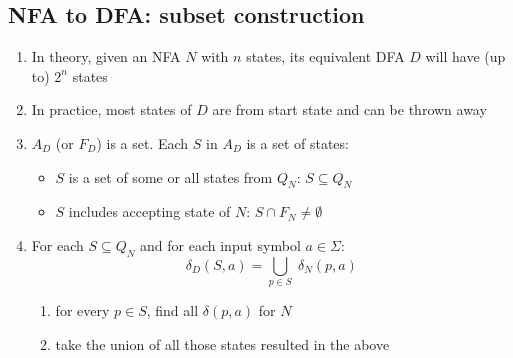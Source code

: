 \documentclass[10pt,a4paper,landscape]{article}
\begin{document}
\begin{multicols*}{3}
\section*{NFA to DFA: subset construction}
\begin{enumerate}
\item In theory, given an NFA $N$ with $n$ states, its equivalent DFA $D$ will have (up to) $2^{n}$ states
\item In practice, most states of $D$ are  from start state and can be thrown away
\item $A_{D}$ (or $F_{D}$) is a set. Each $S$ in $A_{D}$ is a set of states:
  \begin{itemize}
  \item $S$ is a set of some or all states from $Q_{N}$: $S \subseteq Q_{N}$
  \item $S$ includes  accepting state of $N$: $S \cap F_{N} \neq \emptyset$
  \end{itemize}
\item For each $S \subseteq Q_{N}$ and for each input symbol $a \in \Sigma$:
  \begin{equation*}
    \delta_{D}(S,a) = \bigcup_{p \in S}\;\delta_{N}(p,a)
  \end{equation*}
  \begin{enumerate}[label={\alph*.}]
  \item for every $p \in S$, find all $\delta(p,a)$ for $N$
  \item take the union of all those states resulted in the above
  \end{enumerate}
\end{enumerate}



\end{multicols*}
\end{document}
